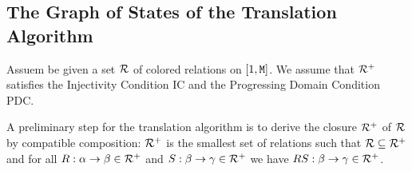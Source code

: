 \documentclass{lmcs}
\begin{document}
%
%
%
%
%
%
%
%
%
%
%

\subsection{The Graph of States of the Translation Algorithm}
Assuem be given a set ${\mathcal R}$ of colored relations on $[1,{\tt M}]$. We assume
that ${\mathcal R}^+$ satisfies the Injectivity Condition IC and the Progressing Domain Condition
PDC. 

A preliminary step for the translation algorithm is to derive the closure ${\mathcal R}^+$ of ${\mathcal R}$ 
by compatible composition: ${\mathcal R}^+$ is the smallest set of relations such that 
${\mathcal R} \subseteq {\mathcal R}^+$ and for all $R:\alpha \rightarrow \beta \in {\mathcal R}^+$ and 
$S:\beta \rightarrow \gamma \in {\mathcal R}^+$ we have $RS:\beta \rightarrow \gamma \in {\mathcal R}^+$.
\end{document}
